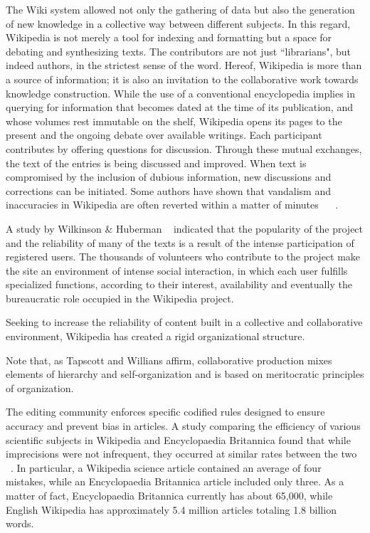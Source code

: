 The Wiki system allowed not only the gathering of data but also the generation of new knowledge in a collective way between different subjects. In this regard, Wikipedia is not merely a tool for indexing and formatting but a space for debating and synthesizing texts. The contributors are not just ``librarians", but indeed authors, in the strictest sense of the word.  Hereof, Wikipedia is more than a source of information; it is also an invitation to the collaborative work towards knowledge construction. While the use of a conventional encyclopedia implies in querying for information that becomes dated at the time of its publication, and whose volumes rest immutable on the shelf, Wikipedia opens its pages to the present and the ongoing debate over available writings. Each participant contributes by offering questions for discussion. Through these mutual exchanges, the text of the entries is being discussed and improved. When text is compromised by the inclusion of dubious information, new discussions and corrections can be initiated.
Some authors have shown that vandalism and inaccuracies in Wikipedia are often reverted within a matter of minutes ~\cite{kittur2007he} ~\cite{viegas2004studying}.

A study by Wilkinson \& Huberman ~\cite{wilkinson2007assessing} indicated that the popularity of the project and the reliability of many of the texts is a result of the intense participation of registered users.
The thousands of volunteers who contribute to the project make the site an environment of intense social interaction, in which each user fulfills specialized functions, according to their interest, availability and eventually the bureaucratic role occupied in the Wikipedia project. 


Seeking to increase the reliability of content built in a collective and collaborative environment, Wikipedia has created a rigid organizational structure. 

Note that, as Tapscott and Willians \cite{tapscott2008wikinomics} affirm, collaborative production mixes elements of hierarchy and self-organization and is based on meritocratic principles of organization.

The editing community enforces specific codified rules designed to ensure accuracy and prevent bias in articles. A study comparing the efficiency of various scientific subjects in Wikipedia and Encyclopaedia Britannica found that while imprecisions were not infrequent, they occurred at similar rates between the two ~\cite{giles2005internet}. In particular, a Wikipedia science article contained an average of four mistakes, while an Encyclopaedia Britannica article included only three. 
As a matter of fact, Encyclopaedia Britannica currently has about 65,000, while English Wikipedia has approximately 5.4 million articles totaling 1.8 billion words. 


